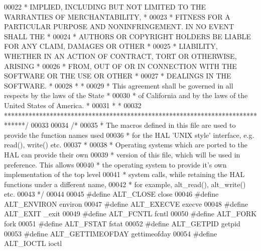 \begin{DoxyCode}
00022 \textcolor{comment}{* IMPLIED, INCLUDING BUT NOT LIMITED TO THE WARRANTIES OF MERCHANTABILITY,    *}
00023 \textcolor{comment}{* FITNESS FOR A PARTICULAR PURPOSE AND NONINFRINGEMENT. IN NO EVENT SHALL THE *}
00024 \textcolor{comment}{* AUTHORS OR COPYRIGHT HOLDERS BE LIABLE FOR ANY CLAIM, DAMAGES OR OTHER      *}
00025 \textcolor{comment}{* LIABILITY, WHETHER IN AN ACTION OF CONTRACT, TORT OR OTHERWISE, ARISING     *}
00026 \textcolor{comment}{* FROM, OUT OF OR IN CONNECTION WITH THE SOFTWARE OR THE USE OR OTHER         *}
00027 \textcolor{comment}{* DEALINGS IN THE SOFTWARE.                                                   *}
00028 \textcolor{comment}{*                                                                             *}
00029 \textcolor{comment}{* This agreement shall be governed in all respects by the laws of the State   *}
00030 \textcolor{comment}{* of California and by the laws of the United States of America.              *}
00031 \textcolor{comment}{*                                                                             *}
00032 \textcolor{comment}{******************************************************************************/}
00033 
00034 \textcolor{comment}{/*}
00035 \textcolor{comment}{ * The macros defined in this file are used to provide the function names used}
00036 \textcolor{comment}{ * for the HAL 'UNIX style' interface, e.g. read(), write() etc. }
00037 \textcolor{comment}{ *}
00038 \textcolor{comment}{ * Operating systems which are ported to the HAL can provide their own }
00039 \textcolor{comment}{ * version of this file, which will be used in preference. This allows}
00040 \textcolor{comment}{ * the operating system to provide it's own implementation of the top level}
00041 \textcolor{comment}{ * system calls, while retaining the HAL functions under a different name, }
00042 \textcolor{comment}{ * for example, alt\_read(), alt\_write() etc.}
00043 \textcolor{comment}{ */}
00044 
00045 \textcolor{preprocessor}{#define ALT\_CLOSE        close}
00046 \textcolor{preprocessor}{#define ALT\_ENVIRON      environ}
00047 \textcolor{preprocessor}{#define ALT\_EXECVE       execve}
00048 \textcolor{preprocessor}{#define ALT\_EXIT         \_exit}
00049 \textcolor{preprocessor}{#define ALT\_FCNTL        fcntl}
00050 \textcolor{preprocessor}{#define ALT\_FORK         fork}
00051 \textcolor{preprocessor}{#define ALT\_FSTAT        fstat}
00052 \textcolor{preprocessor}{#define ALT\_GETPID       getpid}
00053 \textcolor{preprocessor}{#define ALT\_GETTIMEOFDAY gettimeofday}
00054 \textcolor{preprocessor}{#define ALT\_IOCTL        ioctl}

\end{DoxyCode}
